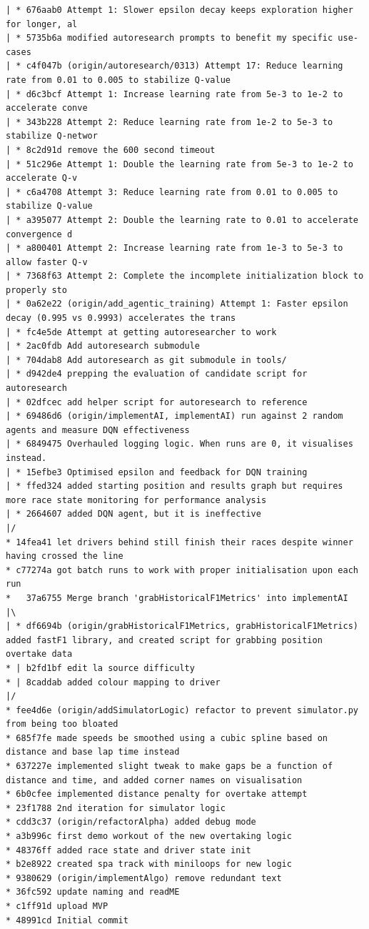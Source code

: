 \begin{appendices}
\begin{small}
\begin{verbatim}
| * 676aab0 Attempt 1: Slower epsilon decay keeps exploration higher for longer, al
| * 5735b6a modified autoresearch prompts to benefit my specific use-cases
| * c4f047b (origin/autoresearch/0313) Attempt 17: Reduce learning rate from 0.01 to 0.005 to stabilize Q-value
| * d6c3bcf Attempt 1: Increase learning rate from 5e-3 to 1e-2 to accelerate conve
| * 343b228 Attempt 2: Reduce learning rate from 1e-2 to 5e-3 to stabilize Q-networ
| * 8c2d91d remove the 600 second timeout
| * 51c296e Attempt 1: Double the learning rate from 5e-3 to 1e-2 to accelerate Q-v
| * c6a4708 Attempt 3: Reduce learning rate from 0.01 to 0.005 to stabilize Q-value
| * a395077 Attempt 2: Double the learning rate to 0.01 to accelerate convergence d
| * a800401 Attempt 2: Increase learning rate from 1e-3 to 5e-3 to allow faster Q-v
| * 7368f63 Attempt 2: Complete the incomplete initialization block to properly sto
| * 0a62e22 (origin/add_agentic_training) Attempt 1: Faster epsilon decay (0.995 vs 0.9993) accelerates the trans
| * fc4e5de Attempt at getting autoresearcher to work
| * 2ac0fdb Add autoresearch submodule
| * 704dab8 Add autoresearch as git submodule in tools/
| * d942de4 prepping the evaluation of candidate script for autoresearch
| * 02dfcec add helper script for autoresearch to reference
| * 69486d6 (origin/implementAI, implementAI) run against 2 random agents and measure DQN effectiveness
| * 6849475 Overhauled logging logic. When runs are 0, it visualises instead.
| * 15efbe3 Optimised epsilon and feedback for DQN training
| * ffed324 added starting position and results graph but requires more race state monitoring for performance analysis
| * 2664607 added DQN agent, but it is ineffective
|/  
* 14fea41 let drivers behind still finish their races despite winner having crossed the line
* c77274a got batch runs to work with proper initialisation upon each run
*   37a6755 Merge branch 'grabHistoricalF1Metrics' into implementAI
|\  
| * df6694b (origin/grabHistoricalF1Metrics, grabHistoricalF1Metrics) added fastF1 library, and created script for grabbing position overtake data
* | b2fd1bf edit la source difficulty
* | 8caddab added colour mapping to driver
|/  
* fee4d6e (origin/addSimulatorLogic) refactor to prevent simulator.py from being too bloated
* 685f7fe made speeds be smoothed using a cubic spline based on distance and base lap time instead
* 637227e implemented slight tweak to make gaps be a function of distance and time, and added corner names on visualisation
* 6b0cfee implemented distance penalty for overtake attempt
* 23f1788 2nd iteration for simulator logic
* cdd3c37 (origin/refactorAlpha) added debug mode
* a3b996c first demo workout of the new overtaking logic
* 48376ff added race state and driver state init
* b2e8922 created spa track with miniloops for new logic
* 9380629 (origin/implementAlgo) remove redundant text
* 36fc592 update naming and readME
* c1ff91d upload MVP
* 48991cd Initial commit


\end{verbatim}
\end{small}
\end{appendices}
